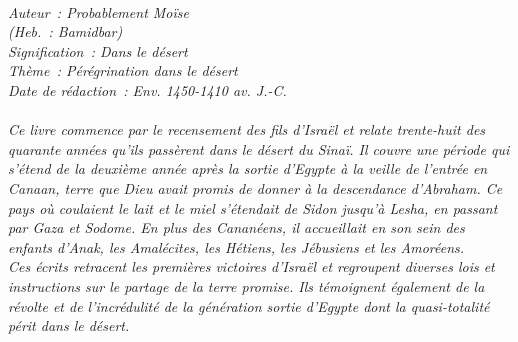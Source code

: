 \BFont
\noindent\hrulefill
{\footnotesize
\textit{
\bigskip
{\centering{}
\\Auteur~: Probablement Moïse
\\(Heb.~: Bamidbar)
\\Signification~: Dans le désert
\\Thème~: Pérégrination dans le désert
\\Date de rédaction~: Env. 1450-1410 av. J.-C.\\}
}
\textit{
\\Ce livre commence par le recensement des fils d'Israël et relate trente-huit des quarante années qu'ils passèrent dans le désert du Sinaï. Il couvre une période qui s'étend de la deuxième année après la sortie d'Egypte à la veille de l'entrée en Canaan, terre que Dieu avait promis de donner à la descendance d'Abraham. Ce pays où coulaient le lait et le miel s'étendait de Sidon jusqu'à Lesha, en passant par Gaza et Sodome. En plus des Cananéens, il accueillait en son sein des enfants d'Anak, les Amalécites, les Hétiens, les Jébusiens et les Amoréens.
\\Ces écrits retracent les premières victoires d'Israël et regroupent diverses lois et instructions sur le partage de la terre promise. Ils témoignent également de la révolte et de l'incrédulité de la génération sortie d'Egypte dont la quasi-totalité périt dans le désert.\bigskip
}
}
\par\nobreak\noindent\hrulefill
